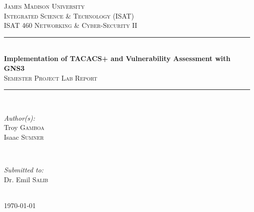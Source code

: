 \documentclass[main.tex]{subfiles}
\begin{document}
\begin{titlepage}

\newcommand{\HRule}{\rule{\linewidth}{0.5mm}} %
\center %

\textsc{\LARGE James Madison University}\\[1.0cm] %
\textsc{\Large Integrated Science \& Technology (ISAT)}\\[0.5cm] %
\textsc{\large ISAT 460 Networking \& Cyber-Security II}\\[0.5cm] %

\HRule \\[0.4cm]
{ \Large \bfseries Implementation of TACACS+ and Vulnerability Assessment with GNS3 }\\[0.4cm] %
\textsc{\large Semester Project Lab Report}\\[0.4cm]
\HRule \\[1.0cm]
 
\begin{minipage}{0.4\textwidth}
\begin{flushleft} \large
\emph{Author(s):}\\
Troy \textsc{Gamboa}\\ %
Isaac \textsc{Sumner}\\
\end{flushleft}
\end{minipage}
~
\begin{minipage}{0.4\textwidth}
\begin{flushright} \large
\emph{Submitted to:} \\
Dr. Emil \textsc{Salib} %
\end{flushright}
\end{minipage}\\[0.5cm]

{\large \today}\\[0.5cm] %


\end{titlepage}
\end{document}
